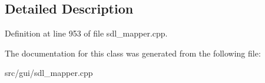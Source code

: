 \subsection{Detailed Description}


Definition at line 953 of file sdl\-\_\-mapper.\-cpp.



The documentation for this class was generated from the following file\-:\begin{DoxyCompactItemize}
\item 
src/gui/sdl\-\_\-mapper.\-cpp\end{DoxyCompactItemize}
